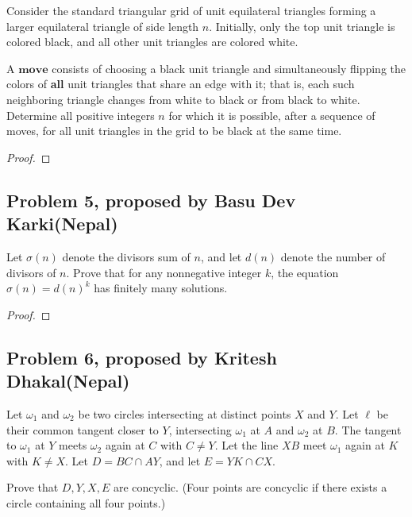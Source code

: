 \documentclass[11pt]{scrartcl}
\begin{document}
\begin{problem}
    Consider the standard triangular grid of unit equilateral triangles forming a larger equilateral triangle of side length $n$. Initially,
     only the top unit triangle is colored black, and all other unit triangles are colored white.

    A $\textbf{move}$ consists of choosing a black unit triangle and simultaneously flipping the colors of \textbf{all} unit triangles that share 
    an edge with it; that is, each such neighboring triangle changes from white to black or from black to white. Determine all positive integers
    $n$ for which it is possible, after a sequence of moves, for all unit triangles in the grid to be black at the same time.
\end{problem}

\begin{proof}
    
\end{proof}

\newpage{}

\subsection{Problem 5, proposed by Basu Dev Karki(Nepal)}

\begin{problem}
    Let $\sigma(n)$ denote the divisors sum of $n$, and let $d(n)$ denote the number of divisors of $n$. Prove that for any nonnegative 
    integer $k$, the equation $\sigma(n) = d(n)^k$ has finitely many solutions.
\end{problem}

\begin{proof}
    
\end{proof}

\newpage

\subsection{Problem 6, proposed by Kritesh Dhakal(Nepal)}

\begin{problem}
    Let $\omega_1$ and $\omega_2$ be two circles intersecting at distinct points $X$ and $Y$. Let $\ell$ be their common tangent closer to $Y$, 
    intersecting $\omega_1$ at $A$ and $\omega_2$ at $B$. The tangent to $\omega_1$ at $Y$ meets $\omega_2$ again at $C$ with $C \neq Y$. 
    Let the line $XB$ meet $\omega_1$ again at $K$ with $K \neq X$. Let $D = BC \cap AY$, and let $E = YK \cap CX$.

    Prove that $D, Y, X, E$ are concyclic. (Four points are concyclic if there exists a circle containing all four points.)
\end{problem}
\end{document}
